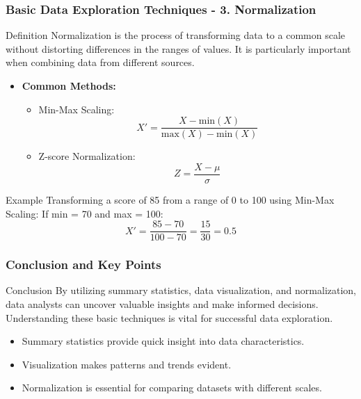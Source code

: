 \documentclass[aspectratio=169]{beamer}
\begin{document}
\begin{frame}[fragile]
    \frametitle{Basic Data Exploration Techniques - 3. Normalization}
    \begin{block}{Definition}
        Normalization is the process of transforming data to a common scale without distorting differences in the ranges of values. It is particularly important when combining data from different sources.
    \end{block}
    
    \begin{itemize}
        \item \textbf{Common Methods:}
        \begin{itemize}
            \item Min-Max Scaling: 
            \begin{equation}
                X' = \frac{X - \text{min}(X)}{\text{max}(X) - \text{min}(X)}
            \end{equation}
            \item Z-score Normalization:
            \begin{equation}
                Z = \frac{X - \mu}{\sigma}
            \end{equation}
        \end{itemize}
    \end{itemize}

    \begin{block}{Example}
        Transforming a score of 85 from a range of 0 to 100 using Min-Max Scaling:
        If min = 70 and max = 100:
        \[
        X' = \frac{85 - 70}{100 - 70} = \frac{15}{30} = 0.5 
        \]
    \end{block}
\end{frame}

\begin{frame}[fragile]
    \frametitle{Conclusion and Key Points}
    \begin{block}{Conclusion}
        By utilizing summary statistics, data visualization, and normalization, data analysts can uncover valuable insights and make informed decisions. Understanding these basic techniques is vital for successful data exploration.
    \end{block}
    
    \begin{itemize}
        \item Summary statistics provide quick insight into data characteristics.
        \item Visualization makes patterns and trends evident.
        \item Normalization is essential for comparing datasets with different scales.
    \end{itemize}
\end{frame}
\end{document}
